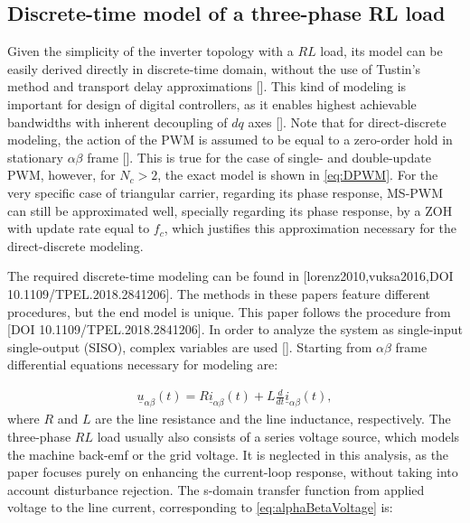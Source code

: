 \documentclass[journal]{IEEEtran}
\begin{document}
\subsection{Discrete-time model of a three-phase RL load}

Given the simplicity of the inverter topology with a $RL$ load, its model can be easily derived directly in discrete-time domain, without the use of Tustin's method and transport delay approximations []. This kind of modeling is important for design of digital controllers, as it enables highest achievable bandwidths with inherent decoupling of $dq$ axes []. 
Note that for direct-discrete modeling, the action of the PWM is assumed to be equal to a zero-order hold in stationary $\alpha \beta$ frame []. This is true for the case of single- and double-update PWM, however, for $N_c>2$, the exact model is shown in \ref{eq:DPWM}. For the very specific case of triangular carrier, regarding its phase response, MS-PWM can still be approximated well, specially regarding its phase response, by a ZOH with update rate equal to $f_c$, which justifies this approximation necessary for the direct-discrete modeling.

The required discrete-time modeling can be found in [lorenz2010,vuksa2016,DOI 10.1109/TPEL.2018.2841206]. The methods in these papers feature different procedures, but the end model is unique. This paper follows the procedure from [DOI 10.1109/TPEL.2018.2841206].
In order to analyze the system as single-input single-output (SISO), complex variables are used []. 
Starting from $\alpha \beta$ frame differential equations necessary for modeling are:

\begin{equation}
\begin{aligned}
\underline{u}_{\alpha \beta} (t) = R \underline{i}_{\alpha \beta} (t) + L \frac{d}{dt} \underline{i}_{\alpha \beta} (t),
\label{eq:alphaBetaVoltage} 
\end{aligned}    
\end{equation}
where $R$ and $L$ are the line resistance and the line inductance, respectively. The three-phase $RL$ load usually also consists of a series voltage source, which models the machine back-emf or the grid voltage. It is neglected in this analysis, as the paper focuses purely on enhancing the current-loop response, without taking into account disturbance rejection.
The s-domain transfer function from applied voltage to the line current, corresponding to \ref{eq:alphaBetaVoltage} is:
\end{document}
